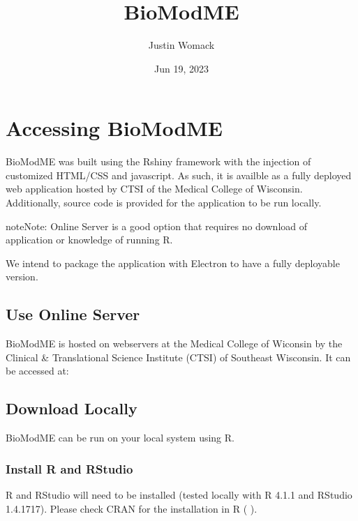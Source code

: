 \documentclass[letterpaper,10pt,english]{sphinxmanual}
\title{BioModME}
\date{Jun 19, 2023}
\author{Justin Womack}
\begin{document}
\pagestyle{empty}
\sphinxmaketitle
\pagestyle{plain}
\sphinxtableofcontents
\pagestyle{normal}
\label{\detokenize{index::doc}}



\chapter{Accessing BioModME}
\label{\detokenize{pages/INTRO_INDEX:accessing-biomodme}}\label{\detokenize{pages/INTRO_INDEX::doc}}
\sphinxAtStartPar
BioModME was built using the Rshiny framework with the injection of customized
HTML/CSS and javascript. As such, it is availble as a fully deployed web
application hosted by CTSI of the Medical College of Wisconsin. Additionally,
source code is provided for the application to be run locally.

\begin{sphinxadmonition}{note}{Note:}
\sphinxAtStartPar
Online Server is a good option that requires no download of application or
knowledge of running R.

\sphinxAtStartPar
We intend to package the application with Electron to have a fully
deployable version.
\end{sphinxadmonition}


\section{Use Online Server}
\label{\detokenize{pages/gettingStarted/useonline:use-online-server}}\label{\detokenize{pages/gettingStarted/useonline::doc}}
\sphinxAtStartPar
BioModME is hosted on webservers at the Medical College of Wiconsin by the
Clinical \& Translational Science Institute (CTSI) of Southeast Wisconsin.
It can be accessed at:

\sphinxAtStartPar
{}


\section{Download Locally}
\label{\detokenize{pages/gettingStarted/downloadtoR:download-locally}}\label{\detokenize{pages/gettingStarted/downloadtoR::doc}}
\sphinxAtStartPar
BioModME can be run on your local system using R.


\subsection{Install R and RStudio}
\label{\detokenize{pages/gettingStarted/downloadtoR:install-r-and-rstudio}}
\sphinxAtStartPar
R and RStudio will need to be installed (tested locally with R 4.1.1 and
RStudio 1.4.1717). Please check CRAN for the installation in R (
).
\end{document}
